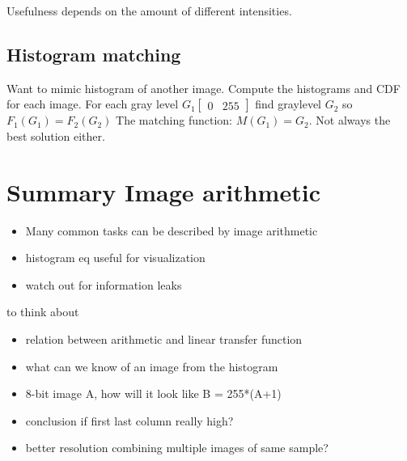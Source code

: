 Usefulness depends on the amount of different intensities. 

\subsection*{Histogram matching}
Want to mimic histogram of another image. Compute the histograms and CDF for each image. For each gray level $G_1 \begin{bmatrix} 0& 255 \end{bmatrix}$ find graylevel $G_2$ so $F_1(G_1) = F_2(G_2)$
The matching function: $M(G_1) = G_2$. Not always the best solution either. 



\section{Summary Image arithmetic}

\begin{itemize}
    \item Many common tasks can be described by image arithmetic
    \item histogram eq useful for visualization 
    \item watch out for information leaks
\end{itemize}

to think about
\begin{itemize}
    \item relation between arithmetic and linear transfer function
    \item what can we know of an image from the histogram
    \item 8-bit image A, how will it look like B = 255*(A+1)
    \item conclusion if first last column really high?
    \item better resolution combining multiple images of same sample?
\end{itemize}

